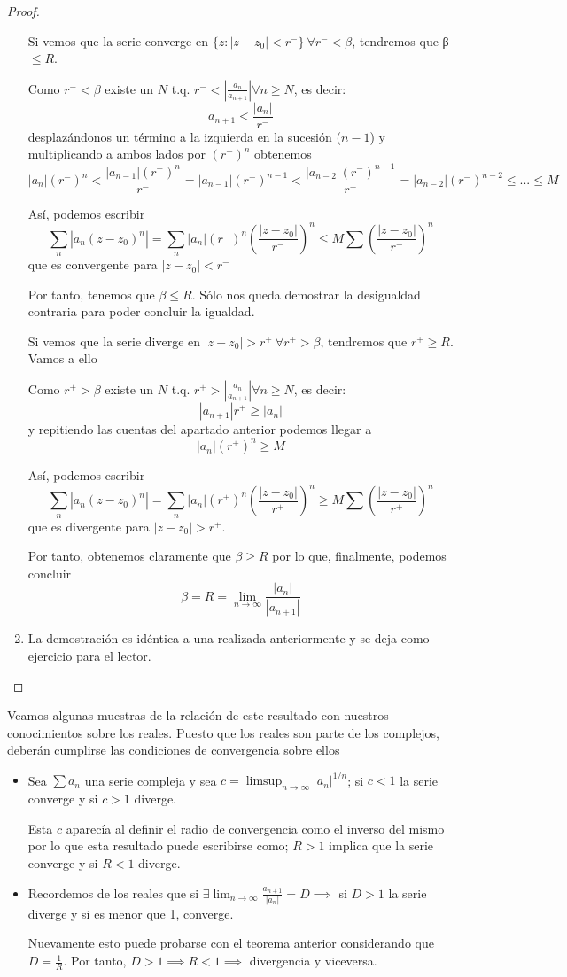 \documentclass{apuntes}
\begin{document}
\begin{proof}
\begin{enumerate}
Si vemos que la serie converge en $\{z: |z-z_0| < r^-\} \ \forall r^-<β$, tendremos que β $\leq R$.

Como $r^- < β$ existe un $N$ t.q. $r^-<\left|\frac{a_n}{a_{n+1}} \right| \forall n \geq N$, es decir:
\[a_{n+1} < \frac{|a_n|}{r^-}\]
desplazándonos un término a la izquierda en la sucesión ($n-1$) y multiplicando a ambos lados por $(r^-)^n$ obtenemos
\[|a_n|(r^-)^n < \frac{|a_{n-1}|(r^-)^n}{r^-} = |a_{n-1}|(r^-)^{n-1}<\frac{|a_{n-2}|(r^-)^{n-1}}{r^-}=|a_{n-2}|(r^-)^{n-2} \leq ... \leq M\]

Así, podemos escribir
\[\sum_n |a_n(z-z_0)^n|=\sum_n |a_n|(r^-)^n\left(\frac{|z-z_0|}{r^-}\right)^n \leq M \sum \left( \frac{|z-z_0|}{r^-}\right)^n\]
que es convergente para $|z-z_0|<r^-$

Por tanto, tenemos que $β \leq R$. Sólo nos queda demostrar la desigualdad contraria para poder concluir la igualdad.

Si vemos que la serie diverge en $|z-z_0|>r^+ \ \forall r^+ > β$, tendremos que $r^+\geq R$. Vamos a ello

Como $r^+ > β$ existe un $N$ t.q. $r^+>\left|\frac{a_n}{a_{n+1}} \right| \forall n \geq N$, es decir:
\[|a_{n+1}| r^+ \geq |a_n|\]
y repitiendo las cuentas del apartado anterior podemos llegar a
\[|a_n|(r^+)^n \geq M\]

Así, podemos escribir
\[\sum_n |a_n(z-z_0)^n|=\sum_n |a_n|(r^+)^n\left(\frac{|z-z_0|}{r^+}\right)^n \geq M \sum \left( \frac{|z-z_0|}{r^+}\right)^n\]
que es divergente para $|z-z_0|>r^+$.

Por tanto, obtenemos claramente que $β \geq R$ por lo que, finalmente, podemos concluir
\[β=R=\lim_{n \to \infty}\frac{|a_n|}{|a_{n+1}|}\]

\item La demostración es idéntica a una realizada anteriormente y se deja como ejercicio para el lector.
\end{enumerate}
\end{proof}


Veamos algunas muestras de la relación de este resultado con nuestros conocimientos sobre los reales. Puesto que los reales son parte de los complejos, deberán cumplirse las condiciones de convergencia sobre ellos
\begin{itemize}
\item
Sea $\sum a_n$ una serie compleja y sea $c=\limsup_{n \to \infty} |a_n|^{1/n}$; si $c<1$ la serie converge y si $c > 1$ diverge.

Esta $c$ aparecía al definir el radio de convergencia como el inverso del mismo por lo que esta resultado puede escribirse como; $R>1$ implica que la serie converge y si $R<1$ diverge.

\item
Recordemos de los reales que si $\exists \lim_{n \to \infty} \frac{a_{n+1}}{|a_n|} = D \implies$ si $D > 1$ la serie diverge y si es menor que 1, converge.

Nuevamente esto puede probarse con el teorema anterior considerando que $D=\frac{1}{R}$. Por tanto, $D>1 \implies R < 1\implies$ divergencia y viceversa.

\end{itemize}
\end{document}

